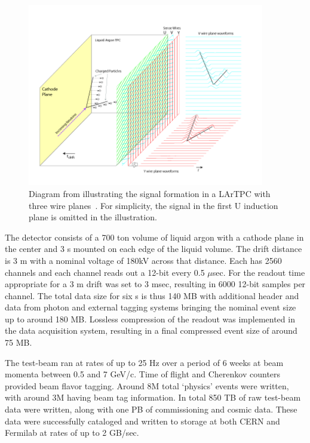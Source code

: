 \begin{figure}[h]
    \centering
\includegraphics[trim={0cm 0.6cm 2.5cm 0.7cm},clip,height=8cm]{graphics/IntroFigures/Fig_04_LArTPC_Concept.png}%
    \caption{Diagram  from    illustrating the signal formation in a LArTPC with three wire planes~\cite{Acciarri:2016smi}. For simplicity, the signal in the first U induction plane is omitted in the illustration. }%
    \label{tpcconcept}
    \end{figure}

The  detector consists of a 700 ton volume of liquid argon with a cathode plane in the center and 3 s mounted on  each  edge of the liquid volume.  The drift distance is  3 m with  a nominal voltage of 180kV  across that distance.  Each  has 2560 channels and each channel reads out a 12-bit  every 0.5 $\mu$sec.   For  the readout time appropriate for a 3 m drift was set to 3 msec, resulting in 6000 12-bit samples per channel.  The total data size for six s is thus 140 MB with additional header and data from photon and external tagging systems bringing the nominal event size up to around 180 MB.  Lossless compression of the  readout was implemented in the data acquisition system, resulting in a final compressed event size of around 75 MB. 

The test-beam ran at rates of up to 25 Hz over a period of 6 weeks at beam momenta between 0.5 and 7 GeV/c.  Time of flight and Cherenkov counters provided beam flavor tagging.  Around 8M total `physics' events were written, with around 3M having beam tag information.  In total  850 TB of raw test-beam data were written, along with one PB of commissioning and cosmic data. These data were successfully cataloged and written to storage at both CERN and Fermilab at rates of up to 2 GB/sec.   


